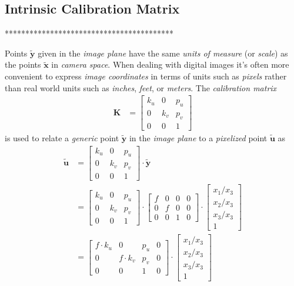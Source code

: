\subsection{Intrinsic Calibration Matrix}
*****************************************\\
\par Points $\mathbf{\tilde{y}}$ given in the \textit{image plane} have the same \textit{units of measure} (or \textit{scale}) as the points $\mathbf{\tilde{x}}$ in \textit{camera space}. When dealing with digital images it's often more convenient to express \textit{image coordinates} in terms of units such as \textit{pixels} rather than real world units such as \textit{inches}, \textit{feet}, or \textit{meters}. The \textit{calibration matrix} 
\begin{equation*}
\begin{split}
\mathbf{K}&=\begin{bmatrix}k_u & 0 & p_u\\ 0 & k_v & p_v\\ 0 & 0 & 1\end{bmatrix}
\end{split}
\end{equation*}%
is used to relate a \textit{generic} point $\mathbf{\tilde{y}}$ in the \textit{image plane} to a \textit{pixelized} point $\mathbf{\tilde{u}}$ as
\begin{equation*}
\begin{split}
\mathbf{\tilde{u}}&=
\begin{bmatrix}k_u & 0 & p_u\\ 0 & k_v & p_v\\ 0 & 0 &1\end{bmatrix}\cdot\mathbf{\tilde{y}}\\
&=\begin{bmatrix}k_u & 0 & p_u\\ 0 & k_v & p_v\\ 0 & 0 & 1\end{bmatrix}\cdot
\begin{bmatrix}f & 0 & 0 & 0\\ 0 & f & 0 & 0\\ 0 & 0 & 1 & 0\end{bmatrix}\cdot
\begin{bmatrix}x_1/x_3 \\ x_2/x_3 \\ x_3/x_3 \\ 1 \end{bmatrix}\\
&=\begin{bmatrix}f\cdot k_u & 0 & p_u & 0\\ 0 & f\cdot k_v & p_v & 0\\ 0 & 0 & 1 & 0\end{bmatrix}\cdot
\begin{bmatrix}x_1/x_3 \\ x_2/x_3 \\ x_3/x_3 \\ 1\end{bmatrix}
\end{split}
\end{equation*}%
